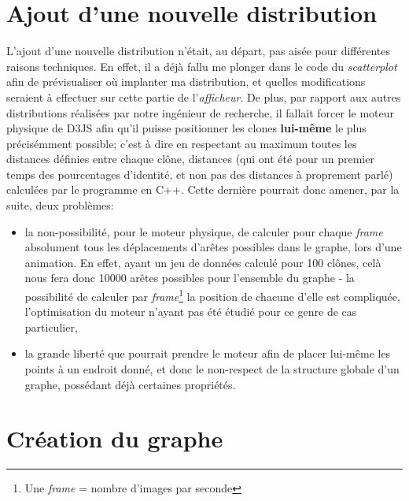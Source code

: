 \documentclass[12pt]{report}
\begin{document}
\begin{spacing}{1.2}
\section{Ajout d'une nouvelle distribution}
L'ajout d'une nouvelle distribution n'était, au départ, pas aisée pour différentes raisons techniques.
\newline
En effet, il a déjà fallu me plonger dans le code du \textit{scatterplot} afin de prévisualiser où implanter ma distribution, et quelles modifications seraient à effectuer sur cette partie de l'\textit{afficheur}.
\newline
De plus, par rapport aux autres distributions réalisées par notre ingénieur de recherche, il fallait forcer le moteur physique de D3JS afin qu'il puisse positionner les clones \textbf{lui-même} le plus précisémment possible; c'est à dire en respectant au maximum toutes les distances définies entre chaque clône, distances (qui ont été pour un premier temps des pourcentages d'identité, et non pas des distances à proprement parlé) calculées par le programme en C++.
\newline
Cette dernière pourrait donc amener, par la suite, deux problèmes: 
\begin{itemize}
\item{la non-possibilité, pour le moteur physique, de calculer pour chaque \textit{frame} absolument tous les déplacements d'arêtes possibles dans le graphe, lors d'une animation. En effet, ayant un jeu de données calculé pour 100 clônes, celà nous fera donc 10000 arêtes possibles pour l'ensemble du graphe - la possibilité de calculer par \textit{frame}\footnote{Une \textit{frame} = nombre d'images par seconde} la position de chacune d'elle est compliquée, l'optimisation du moteur n'ayant pas été étudié pour ce genre de cas particulier,}
\item{la grande liberté que pourrait prendre le moteur afin de placer lui-même les points à un endroit donné, et donc le non-respect de la structure globale d'un graphe, possédant déjà certaines propriétés.}
\end{itemize}

\section{Création du graphe}


\end{spacing}
\end{document}
